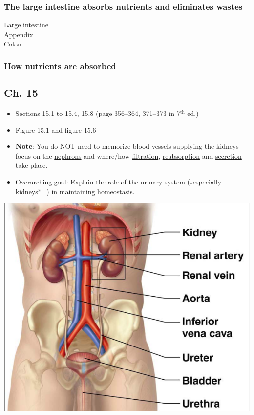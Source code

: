 \documentclass[11pt]{article}
\begin{document}
\subsubsection{The large intestine  absorbs nutrients and eliminates wastes}
\label{sec:orgc92be6d}

\begin{description}
\item[{Large intestine}] 

\item[{Appendix}] 

\item[{Colon}] 
\end{description}

\subsubsection{How nutrients are absorbed}
\label{sec:org25e29c7}
\subsection{Ch. 15}
\label{sec:org2406e5d}
\begin{itemize}
\item Sections 15.1 to 15.4, 15.8 (page 356--364, 371--373 in 7\(^{\text{th}}\) ed.)
\item Figure 15.1 and figure 15.6
\item \textbf{Note}: You do NOT need to memorize blood vessels supplying the kidneys---focus
on the \uline{nephrons} and where/how \uline{filtration}, \uline{reabsorption} and \uline{secretion} take
place.
\item Overarching goal: Explain the role of the urinary system (\(_{\text{*}}\)especially
kidneys*\_) in maintaining homeostasis.
\end{itemize}

\begin{center}
\includegraphics[width=.9\linewidth]{Ch. 15/screenshot_2016-11-15_19-11-15.png}
\end{center}
\end{document}

